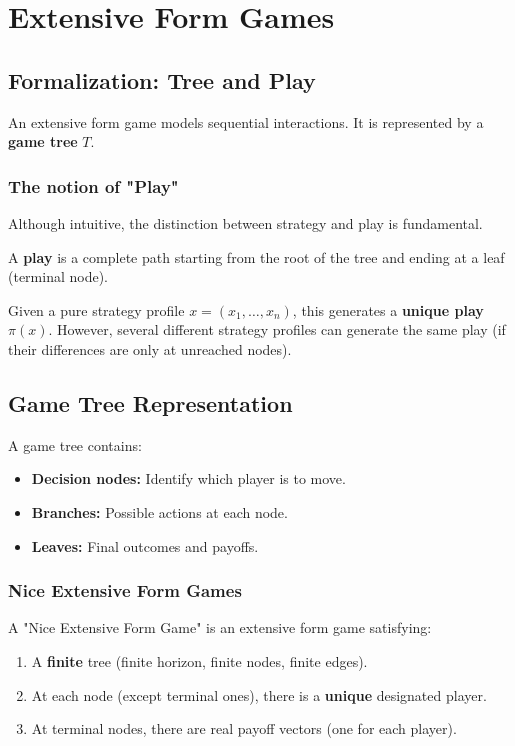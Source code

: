 \chapter{Extensive Form Games}

\section{Formalization: Tree and Play}

An extensive form game models sequential interactions. It is represented by a \textbf{game tree} $T$.

\subsection{The notion of "Play"}
Although intuitive, the distinction between strategy and play is fundamental.
\begin{definition}[Play]
A \textbf{play} is a complete path starting from the root of the tree and ending at a leaf (terminal node).
\end{definition}

\begin{proposition}
Given a pure strategy profile $x = (x_1, \dots, x_n)$, this generates a \textbf{unique play} $\pi(x)$.
However, several different strategy profiles can generate the same play (if their differences are only at unreached nodes).
\end{proposition}

\section{Game Tree Representation}

A game tree contains:
\begin{itemize}
    \item \textbf{Decision nodes:} Identify which player is to move.
    \item \textbf{Branches:} Possible actions at each node.
    \item \textbf{Leaves:} Final outcomes and payoffs.
\end{itemize}

\subsection{Nice Extensive Form Games}
\begin{definition}
A "Nice Extensive Form Game" is an extensive form game satisfying:
\begin{enumerate}
    \item A \textbf{finite} tree (finite horizon, finite nodes, finite edges).
    \item At each node (except terminal ones), there is a \textbf{unique} designated player.
    \item At terminal nodes, there are real payoff vectors (one for each player).
\end{enumerate}
\end{definition}

